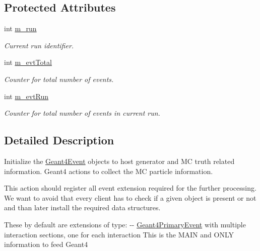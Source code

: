 \subsection*{Protected Attributes}
\begin{DoxyCompactItemize}
\item 
int \hyperlink{class_d_d4hep_1_1_simulation_1_1_geant4_generator_action_init_a251d29e869dd2401e208f39176cb6fe1}{m\_\-run}
\begin{DoxyCompactList}\small\item\em Current run identifier. \item\end{DoxyCompactList}\item 
int \hyperlink{class_d_d4hep_1_1_simulation_1_1_geant4_generator_action_init_a88579a131b4e22fa0b05f87fe1a8276c}{m\_\-evtTotal}
\begin{DoxyCompactList}\small\item\em Counter for total number of events. \item\end{DoxyCompactList}\item 
int \hyperlink{class_d_d4hep_1_1_simulation_1_1_geant4_generator_action_init_a4d685bb901485377aa271474ed70969b}{m\_\-evtRun}
\begin{DoxyCompactList}\small\item\em Counter for total number of events in current run. \item\end{DoxyCompactList}\end{DoxyCompactItemize}


\subsection{Detailed Description}
Initialize the \hyperlink{class_d_d4hep_1_1_simulation_1_1_geant4_event}{Geant4Event} objects to host generator and MC truth related information. Geant4 actions to collect the MC particle information.

This action should register all event extension required for the further processing. We want to avoid that every client has to check if a given object is present or not and than later install the required data structures.

These by default are extensions of type: -\/-\/ \hyperlink{class_d_d4hep_1_1_simulation_1_1_geant4_primary_event}{Geant4PrimaryEvent} with multiple interaction sections, one for each interaction This is the MAIN and ONLY information to feed Geant4

